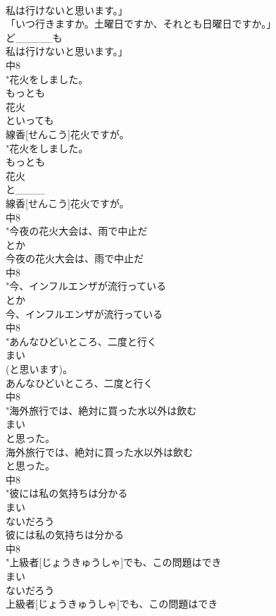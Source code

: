\documentclass[8pt]{extreport}
\begin{document}
\begin{CJK}{UTF8}{min}
\\	私は行けないと思います。」
\\	「いつ行きますか。土曜日ですか、それとも日曜日ですか。」
\\	ど_____も
\\	私は行けないと思います。」
\\	中8
\\	"花火をしました。
\\	もっとも
\\	花火
\\	といっても
\\	線香[せんこう]花火ですが。
\\	"花火をしました。
\\	もっとも
\\	花火
\\	と____
\\	線香[せんこう]花火ですが。
\\	中8
\\	"今夜の花火大会は、雨で中止だ
\\	とか
\\	今夜の花火大会は、雨で中止だ
\\	中8
\\	"今、インフルエンザが流行っている
\\	とか
\\	今、インフルエンザが流行っている
\\	中8
\\	"あんなひどいところ、二度と行く
\\	まい
\\	(と思います)。
\\	あんなひどいところ、二度と行く
\\	中8
\\	"海外旅行では、絶対に買った水以外は飲む
\\	まい
\\	と思った。
\\	海外旅行では、絶対に買った水以外は飲む
\\	と思った。
\\	中8
\\	"彼には私の気持ちは分かる
\\	まい
\\	ないだろう	
\\	彼には私の気持ちは分かる
\\	中8
\\	"上級者[じょうきゅうしゃ]でも、この問題はでき
\\	まい
\\	ないだろう	
\\	上級者[じょうきゅうしゃ]でも、この問題はでき

\end{CJK}
\end{document}
